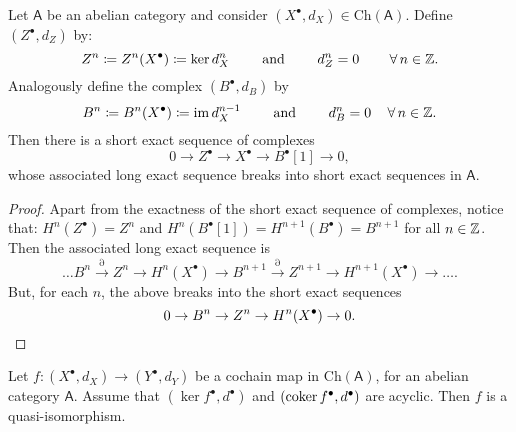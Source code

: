 \begin{lem}
	Let $\mathsf{A}$ be an abelian category and consider
	$\left( X^{\bullet}, d_{X} \right) \in \mathrm{Ch}(\mathsf{A})$.
	Define $\left( Z^{\bullet}, d_{Z} \right)$ by:
	\begin{equation}
		Z^n \coloneqq Z^n(X^\bullet) \coloneqq \ker d_X^n \qquad \text{ and } \qquad
		d^n_{Z} = 0 \qquad \,\forall\, n \in \mathbb{Z}
	.\end{equation} 
	Analogously define the complex $\left( B^{\bullet}, d_{B} \right)$ by
	\begin{equation}
		B^n \coloneqq B^n(X^\bullet) \coloneqq \operatorname{im} d_X^{n-1} \qquad \text{ and } \qquad
		d^n_{B} = 0 \quad \,\forall\, n \in \mathbb{Z}
	.\end{equation} 
	Then there is a short exact sequence of complexes
	\begin{equation}
	0\to Z^\bullet \to X^\bullet \to
	B^\bullet[1] \to 0
	,\end{equation} 
	whose associated long exact sequence breaks into short exact sequences in $\mathsf{A}$.
\end{lem} 
\begin{proof}
	Apart from the exactness of the short exact sequence of complexes, notice that:
	$H^n(Z^\bullet) = Z^n$ and $H^n(B^\bullet[1]) = H^{n+1}(B^\bullet) = B^{n+1}$ for all $n \in \mathbb{Z}$.
	Then the associated long exact sequence is
	\begin{equation}
		\ldots B^n \xrightarrow{\partial} Z^n \to H^n(X^\bullet) \to B^{n+1} \xrightarrow{\partial}
		Z^{n+1} \to H^{n+1}(X^\bullet) \to \ldots
	.\end{equation} 
	But, for each $n$, the above breaks into the short exact sequences
	\begin{equation*}
		0 \to B^n \to Z^n \to H^n(X^\bullet) \to 0.\qedhere
	\end{equation*} 
\end{proof}

\begin{lem}
	Let $f\colon \left( X^{\bullet}, d_{X} \right) \to \left( Y^{\bullet}, d_{Y} \right)$
	be a cochain map in $\mathrm{Ch}(\mathsf{A})$,
	for an abelian category $\mathsf{A}$.
	Assume that $\left(\ker f^\bullet, d^\bullet\right)$ and $\left(\operatorname{coker} f^\bullet, d^\bullet\right)$
	are acyclic.
	Then $f$ is a quasi-isomorphism.
\end{lem} 

